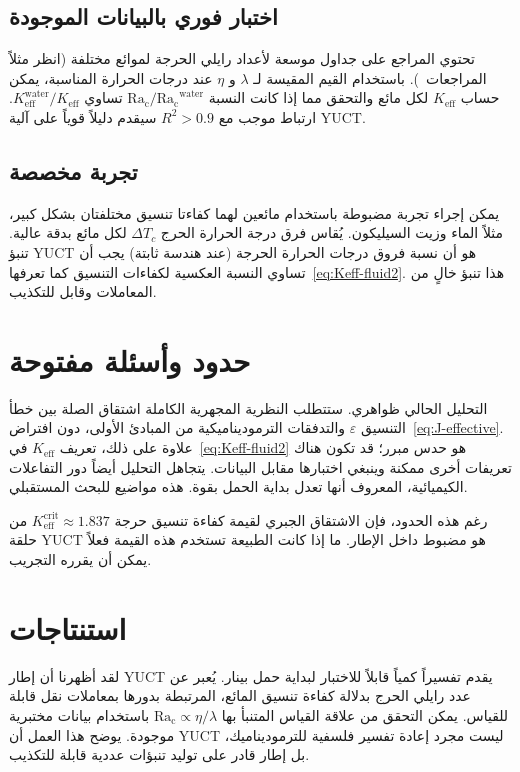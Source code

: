\documentclass[12pt,a4paper]{article}
\begin{document}
	\subsection{اختبار فوري بالبيانات الموجودة}
	تحتوي المراجع على جداول موسعة لأعداد رايلي الحرجة لموائع مختلفة (انظر مثلاً المراجعات~\cite{Chandrasekhar1961, Cross1993}). باستخدام القيم المقيسة لـ \(\lambda\) و \(\eta\) عند درجات الحرارة المناسبة، يمكن حساب \(K_{\mathrm{eff}}\) لكل مائع والتحقق مما إذا كانت النسبة \(\mathrm{Ra_c}/\mathrm{Ra_c}^{\mathrm{water}}\) تساوي \(K_{\mathrm{eff}}^{\mathrm{water}} / K_{\mathrm{eff}}\). ارتباط موجب مع \(R^2 > 0.9\) سيقدم دليلاً قوياً على آلية YUCT.
	
	\subsection{تجربة مخصصة}
	يمكن إجراء تجربة مضبوطة باستخدام مائعين لهما كفاءتا تنسيق مختلفتان بشكل كبير، مثلاً الماء وزيت السيليكون. يُقاس فرق درجة الحرارة الحرج \(\Delta T_c\) لكل مائع بدقة عالية. تنبؤ YUCT هو أن نسبة فروق درجات الحرارة الحرجة (عند هندسة ثابتة) يجب أن تساوي النسبة العكسية لكفاءات التنسيق كما تعرفها~\eqref{eq:Keff-fluid2}. هذا تنبؤ خالٍ من المعاملات وقابل للتكذيب.
	
	\section{حدود وأسئلة مفتوحة}
	التحليل الحالي ظواهري. ستتطلب النظرية المجهرية الكاملة اشتقاق الصلة بين خطأ التنسيق \(\varepsilon\) والتدفقات الترموديناميكية من المبادئ الأولى، دون افتراض~\eqref{eq:J-effective}. علاوة على ذلك، تعريف \(K_{\mathrm{eff}}\) في~\eqref{eq:Keff-fluid2} هو حدس مبرر؛ قد تكون هناك تعريفات أخرى ممكنة وينبغي اختبارها مقابل البيانات. يتجاهل التحليل أيضاً دور التفاعلات الكيميائية، المعروف أنها تعدل بداية الحمل بقوة. هذه مواضيع للبحث المستقبلي.
	
	رغم هذه الحدود، فإن الاشتقاق الجبري لقيمة كفاءة تنسيق حرجة \(K_{\mathrm{eff}}^{\mathrm{crit}} \approx 1.837\) من حلقة YUCT هو مضبوط داخل الإطار. ما إذا كانت الطبيعة تستخدم هذه القيمة فعلاً يمكن أن يقرره التجريب.
	
	\section{استنتاجات}
	لقد أظهرنا أن إطار YUCT يقدم تفسيراً كمياً قابلاً للاختبار لبداية حمل بينار. يُعبر عن عدد رايلي الحرج بدلالة كفاءة تنسيق المائع، المرتبطة بدورها بمعاملات نقل قابلة للقياس. يمكن التحقق من علاقة القياس المتنبأ بها \(\mathrm{Ra_c} \propto \eta/\lambda\) باستخدام بيانات مختبرية موجودة. يوضح هذا العمل أن YUCT ليست مجرد إعادة تفسير فلسفية للترموديناميك، بل إطار قادر على توليد تنبؤات عددية قابلة للتكذيب.
	
\end{document}
